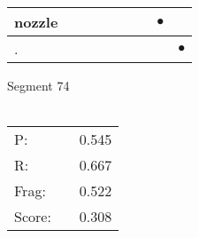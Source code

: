 \documentclass[landscape]{article}
\newcommand{\ssp}{\hspace{2pt}}
\newcommand{\mex}{\cellcolor{g}$\bullet$}
\begin{document}
\begin{tabular}{|l|p{10pt}|p{10pt}|p{10pt}|p{10pt}|p{10pt}|p{10pt}|p{10pt}|p{10pt}|}
\hline
\ssp \cellcolor{ref6}nozzle \ssp&\hspace{2pt}&\hspace{2pt}&\hspace{2pt}&\hspace{2pt}&\hspace{2pt}&\hspace{2pt}&\hspace{2pt}\mex&\hspace{2pt}\\
\hline
\ssp \cellcolor{ref7}. \ssp&\hspace{2pt}&\hspace{2pt}&\hspace{2pt}&\hspace{2pt}&\hspace{2pt}&\hspace{2pt}&\hspace{2pt}&\hspace{2pt}\mex\\
\hline
\end{tabular}

\vspace{6pt}
\noindent Segment 74\\\\
\noindent\begin{tabular}{lm{12pt}r}
\hline
P:&&0.545\\
R:&&0.667\\
Frag:&&0.522\\
Score:&&0.308\\
\end{tabular}

\newpage
\end{document}
